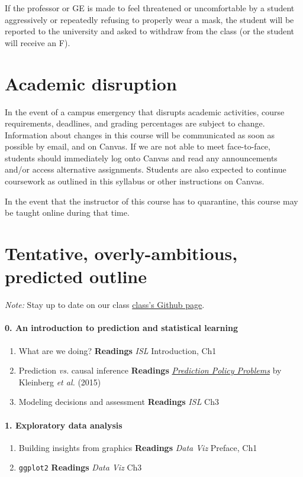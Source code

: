 \documentclass[10pt]{article}
\begin{document}
If the professor or GE is made to feel threatened or uncomfortable by a student aggressively or repeatedly refusing to properly wear a mask, the student will be reported to the university and asked to withdraw from the class (or the student will receive an F).

\section*{Academic disruption}

In the event of a campus emergency that disrupts academic activities, course requirements, deadlines, and grading
percentages are subject to change. Information about changes in this course will be communicated as soon as possible by email, and on Canvas. If we are not able to meet face-to-face, students should immediately log onto Canvas and read any announcements and/or access alternative assignments. Students are also expected to continue coursework as outlined in this syllabus or other instructions on Canvas.

In the event that the instructor of this course has to quarantine, this course may be taught online during that time.

\newpage

\section*{Tentative, overly-ambitious, predicted outline}

\textit{Note:} Stay up to date on our class \href{https://github.com/edrubin/EC524W25/}{class's Github page}.

\paragraph{0. An introduction to prediction and statistical learning}
\begin{enumerate}
  \item What are we doing? \textbf{Readings} \textit{ISL} Introduction, Ch1
  \item Prediction \textit{vs.} causal inference \textbf{Readings} \href{https://www.aeaweb.org/articles?id=10.1257/aer.p20151023}{\textit{Prediction Policy Problems}} by Kleinberg \textit{et al.} (2015)
  \item Modeling decisions and assessment \textbf{Readings} \textit{ISL} Ch3
\end{enumerate}

\paragraph{1. Exploratory data analysis}
\begin{enumerate}
  \item Building insights from graphics \textbf{Readings} \textit{Data Viz} Preface, Ch1
  \item \texttt{ggplot2} \textbf{Readings} \textit{Data Viz} Ch3
\end{enumerate}
\end{document}

